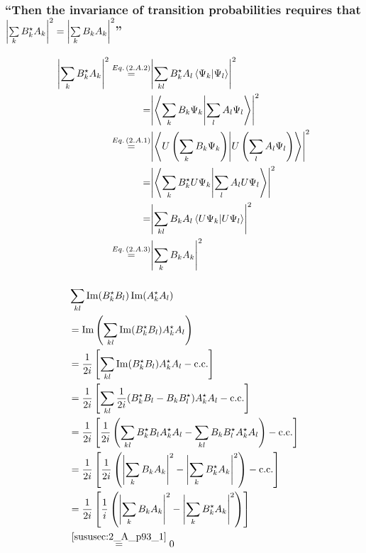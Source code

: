 \subsubsection{\enquote{Then the invariance of transition probabilities requires that $\abs{\sum\limits_{k}B_k^\star A_k}^2=\abs{\sum\limits_{k}B_k A_k}^2$} }\label{sususec:2_A_p93_1}
\begin{align*} 
	\abs{\sum\limits_{k}B_k^\star A_k}^2\overset{Eq.\,({2.A.2})}{=}&\abs{\sum\limits_{k l}B_k^\star A_l \braket{\Psi_k}{\Psi_l}}^2\\
	=&\abs{\braket{\sum\limits_{k}B_k \Psi_k}{\sum\limits_{l}A_l \Psi_l}}^2\\
	\overset{Eq.\,({2.A.1})}{=}&\abs{\braket{U\left(\sum\limits_{k}B_k \Psi_k\right)}{U\left(\sum\limits_{l}A_l \Psi_l\right)}}^2\\
	=&\abs{\braket{\sum\limits_{k}B_k^\star U\Psi_k}{\sum\limits_{l}A_l U\Psi_l}}^2\\
	=&\abs{\sum\limits_{k l}B_k A_l \braket{U\Psi_k}{U\Psi_l}}^2\\
	\overset{Eq.\,({2.A.3})}{=}&\abs{\sum\limits_{k}B_k A_k}^2
\end{align*}

\subsubsection{}
\begin{align*} 
	&\sum\limits_{k l}\Im(B_k^\star B_l) \Im(A_k^\star A_l)\\
	&=\Im\left(\sum\limits_{k l}\Im(B_k^\star B_l) A_k^\star A_l\right)\\
	&=\dfrac{1}{2 i}\left[\sum\limits_{k l}\Im(B_k^\star B_l) A_k^\star A_l- \text{c.c.}\right]\\
	&=\dfrac{1}{2 i}\left[\sum\limits_{k l}\dfrac{1}{2i}(B_k^\star B_l-B_k B_l^\star) A_k^\star A_l- \text{c.c.}\right]\\
	&=\dfrac{1}{2 i}\left[\dfrac{1}{2i}\left(\sum\limits_{k l}B_k^\star B_l A_k^\star A_l- \sum\limits_{k l}B_k B_l^\star A_k^\star A_l\right)- \text{c.c.}\right]\\
	&=\dfrac{1}{2 i}\left[\dfrac{1}{2i}\left(\abs{\sum\limits_{k}B_k A_k}^2-\abs{\sum\limits_{k}B_k^\star A_k}^2\right)- \text{c.c.}\right]\\
	&=\dfrac{1}{2 i}\left[\dfrac{1}{i}\left(\abs{\sum\limits_{k}B_k A_k}^2-\abs{\sum\limits_{k}B_k^\star A_k}^2\right)\right]\\
	&\overset{\ref{sususec:2_A_p93_1}}{=}0
\end{align*}


